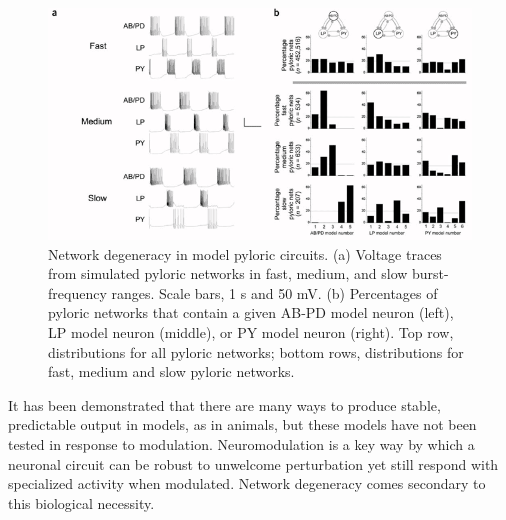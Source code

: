 \begin{figure}[h]
	\centering
	\includegraphics[width=1.0\linewidth]{gfx/Prinz6}
	\caption[Network degeneracy in model pyloric circuits.]{Network degeneracy in model pyloric circuits. (a) Voltage traces from simulated pyloric networks in fast, medium, and slow burst-frequency ranges. Scale bars, 1 s and 50 mV. (b) Percentages of pyloric networks that contain a given \acs{AB}-\acs{PD} model neuron (left), \acs{LP} model neuron (middle), or \acs{PY} model neuron (right). Top row, distributions for all pyloric networks; bottom rows, distributions for fast, medium and slow pyloric networks\autocite{PrinzSimilarnetworkactivity2004}.}
	\label{fig:prinz6}
\end{figure}

It has been demonstrated that there are many ways to produce stable, predictable output in models, as in animals, but these models have not been tested in response to modulation. Neuromodulation is a key way by which a neuronal circuit can be robust to unwelcome perturbation yet still respond with specialized activity when modulated. Network degeneracy comes secondary to this biological necessity.



